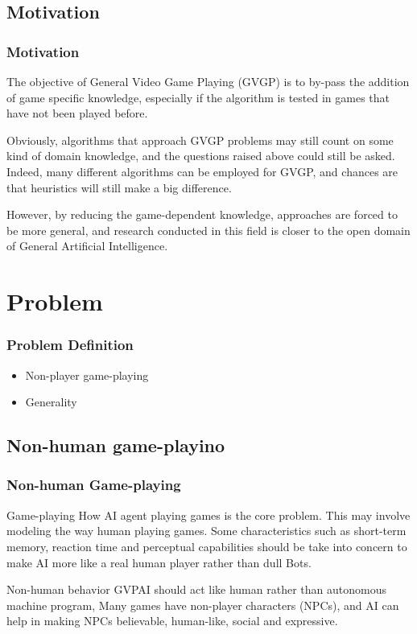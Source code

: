 \documentclass{beamer}
\begin{document}
\subsection{Motivation}
\begin{frame}
  \frametitle{Motivation\cite{2}}
  The objective of General Video Game Playing (GVGP) is to by-pass the addition of game specific knowledge, especially if the algorithm is tested in games that have not been played before.

  Obviously, algorithms that approach GVGP problems may still count on some kind of domain knowledge, and the questions raised above could still be asked. Indeed, many different algorithms can be employed for GVGP, and chances are that heuristics will still make a big difference. 
  
  However, by reducing the game-dependent knowledge, approaches are forced to be more general, and research conducted in this field is closer to the open domain of General Artificial Intelligence.
  
\end{frame}



\section{Problem}
\begin{frame}
\frametitle{Problem Definition}
\begin{itemize}
\item Non-player game-playing
\item Generality
\end{itemize}
\end{frame}

\subsection{Non-human game-playino}
\begin{frame}
\frametitle{Non-human Game-playing\cite{3}}
\begin{block}{Game-playing}
How AI agent playing games is the core problem. This may involve modeling the way human playing games. Some characteristics such as short-term memory, reaction time and perceptual capabilities should be take into concern to make AI more like a real human player rather than dull Bots.
\end{block}

\begin{block}{Non-human behavior}
GVPAI should act like human rather than autonomous machine program, Many games have non-player characters (NPCs), and AI can help in making NPCs believable, human-like, social and expressive.
\end{block}
 
\end{frame}
\end{document}
